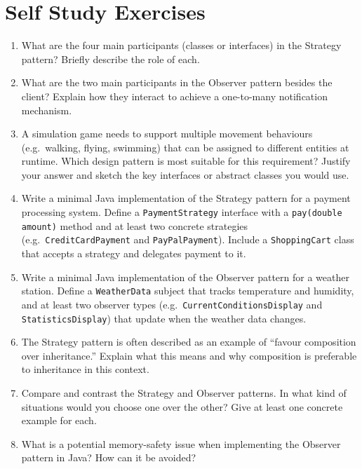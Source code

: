 \documentclass[twoside=false,DIV=14]{scrartcl}
\begin{document}
\section*{Self Study Exercises}
\begin{enumerate}
\item What are the four main participants (classes or interfaces) in the Strategy pattern?  Briefly describe the role of each.

\item What are the two main participants in the Observer pattern besides the client?  Explain how they interact to achieve a one-to-many notification mechanism.

\item A simulation game needs to support multiple movement behaviours (e.g.\ walking, flying, swimming) that can be assigned to different entities at runtime.  Which design pattern is most suitable for this requirement?  Justify your answer and sketch the key interfaces or abstract classes you would use.

\item Write a minimal Java implementation of the Strategy pattern for a payment processing system.  Define a \texttt{PaymentStrategy} interface with a \texttt{pay(double amount)} method and at least two concrete strategies (e.g.\ \texttt{CreditCardPayment} and \texttt{PayPalPayment}).  Include a \texttt{ShoppingCart} class that accepts a strategy and delegates payment to it.

\item Write a minimal Java implementation of the Observer pattern for a weather station.  Define a \texttt{WeatherData} subject that tracks temperature and humidity, and at least two observer types (e.g.\ \texttt{CurrentConditionsDisplay} and \texttt{StatisticsDisplay}) that update when the weather data changes.

\item The Strategy pattern is often described as an example of ``favour composition over inheritance.''  Explain what this means and why composition is preferable to inheritance in this context.

\item Compare and contrast the Strategy and Observer patterns.  In what kind of situations would you choose one over the other?  Give at least one concrete example for each.

\item What is a potential memory-safety issue when implementing the Observer pattern in Java?  How can it be avoided?


\end{enumerate}
\end{document}
